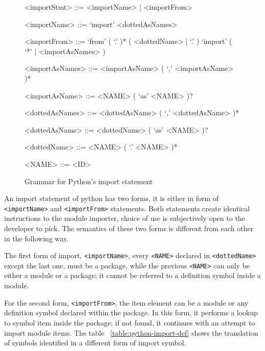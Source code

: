 \begin{figure}[ht]
    \begin{framed}
        \begin{grammar}
            <importStmt>
            ::= <importName>
            | <importFrom>

            <importName>
            ::= `import' <dottedAsNames>

            <importFrom>
            ::= `from' ( `.' )* ( <dottedName> | `.' ) `import' ( `*' | <importAsNames> )

            <importAsNames>
            ::= <importAsName> ( `,' <importAsName> )*

            <importAsName>
            ::= <NAME> ( `as' <NAME> )?

            <dottedAsNames>
            ::= <dottedAsName> ( `,' <dottedAsName> )*

            <dottedAsName>
            ::= <dottedName> ( `as' <NAME> )?

            <dottedName>
            ::= <NAME> ( `.' <NAME> )*

            <NAME> ::= <ID>
        \end{grammar}
    \end{framed}
    \caption{Grammar for Python's import statement }
    \label{fig:python-import-stmt-syntax}
\end{figure}

An import statement of python has two forms, it is either in form of \texttt{<importName>} and \texttt{<importFrom>} statements. Both statements create identical instructions to the module importer, choice of use is subjectively open to the developer to pick. The semantics of these two forms is different from each other in the following way.

The first form of import, \texttt{<importName>}, every \texttt{<NAME>} declared in \texttt{<dottedName>} except the last one, must be a package, while the previous \texttt{<NAME>} can only be either a module or a package; it cannot be referred to a definition symbol inside a module.

For the second form, \texttt{<importFrom>}, the item element can be a module or any definition symbol declared within the package. In this form, it performs a lookup to symbol item inside the package; if not found, it continues with an attempt to import module items. The table ~\ref{table:python-import-def} shows the translation of symbols identified in a different form of import symbol.

